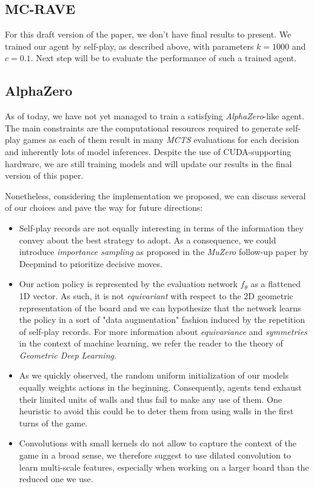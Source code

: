\documentclass[journal, a4paper]{IEEEtran}
\begin{document}
\subsection{MC-RAVE}
For this draft version of the paper, we don't have final results to present. We trained our agent by self-play, as described above, with parameters $k=1000$ and $c=0.1$. Next step will be to evaluate the performance of such a trained agent.

\subsection{AlphaZero}
As of today, we have not yet managed to train a satisfying \textit{AlphaZero}-like agent. The main constraints are the computational resources required to generate self-play games as each of them result in many \textit{MCTS } evaluations for each decision and inherently lots of model inferences. Despite the use of CUDA-supporting hardware, we are still training models and will update our results in the final version of this paper.

Nonetheless, considering the implementation we proposed, we can discuss several of our choices and pave the way for future directions:
\begin{itemize}
    \item Self-play records are not equally interesting in terms of the information they convey about the best strategy to adopt. As a consequence, we could introduce \textit{importance sampling} as proposed in the \textit{MuZero}\cite{muzero} follow-up paper by Deepmind to prioritize decisive moves.
    \item Our action policy is represented by the evaluation network $f_\theta$ as a flattened 1D vector. As such, it is not \textit{equivariant} with respect to the 2D geometric representation of the board and we can hypothesize that the network learns the policy in a sort of "data augmentation" fashion induced by the repetition of self-play records. For more information about \textit{equivariance} and \textit{symmetries} in the context of machine learning, we refer the reader to the theory of \textit{Geometric Deep Learning}\cite{gdl}.
    \item As we quickly observed, the random uniform initialization of our models equally weights actions in the beginning. Consequently, agents tend exhaust their limited units of walls and thus fail to make any use of them. One heuristic to avoid this could be to deter them from using walls in the first turns of the game.
    \item Convolutions with small kernels do not allow to capture the context of the game in a broad sense, we therefore suggest to use dilated convolution\cite{dilated-conv} to learn multi-scale features, especially when working on a larger board than the reduced one we use.
\end{itemize}
\end{document}
